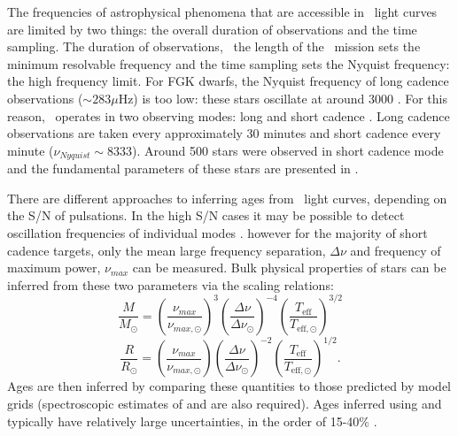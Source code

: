 
The frequencies of astrophysical phenomena that are accessible in \kepler\
light curves are limited by two things: the overall duration of observations
and the time sampling.
The duration of observations, \ie\ the length of the \kepler\ mission sets the
minimum resolvable frequency and the time sampling sets the Nyquist frequency:
the high frequency limit.
For FGK dwarfs, the Nyquist frequency of long cadence observations ($\sim 283
\mu$Hz) is too low: these stars oscillate at around 3000 \uHz.
For this reason, \kepler\ operates in two observing modes: long and short
cadence \citep[][]{smith2012, stumpe2012}.
Long cadence observations are taken every approximately 30 minutes and short
cadence every minute ($\nu_{Nyquist} \sim 8333$\uHz).
Around 500 stars were observed in short cadence mode and the fundamental
parameters of these stars are presented in \citet{Chaplin2014}.

There are different approaches to inferring ages from \kepler\ light curves,
depending on the S/N of pulsations.
In the high S/N cases it may be possible to detect oscillation frequencies of
individual modes \citep[\eg][]{Lebreton2014, Metcalfe2010, Silva-aguirre2013}.
however for the majority of short cadence targets, only the
mean large frequency separation, $\Delta\nu$ and frequency of maximum power,
$\nu_{max}$ can be measured.
Bulk physical properties of stars can be inferred from these two parameters
via the scaling relations:
\begin{equation}
    \frac{M}{M_\odot} = \left(\frac{\nu_{max}}{\nu_{max,\odot}}\right)^3
    \left(\frac{\Delta\nu}{\Delta\nu_\odot}\right)^{-4}
    \left(\frac{T_{\mathrm{eff}}}{T_{\mathrm{eff},\odot}}\right)^{3/2}
\end{equation}
\begin{equation}
    \frac{R}{R_\odot} = \left(\frac{\nu_{max}}{\nu_{max,\odot}}\right)
    \left(\frac{\Delta\nu}{\Delta\nu_\odot}\right)^{-2}
    \left(\frac{T_{\mathrm{eff}}}{T_{\mathrm{eff},\odot}}\right)^{1/2}.
\end{equation}
Ages are then inferred by comparing these quantities to those predicted by
model grids (spectroscopic estimates of \teff and \feh are also required).
Ages inferred using \dnu and \numax typically have relatively large
uncertainties, in the order of 15-40\% \citep{Silva-aguirre2015a}.


